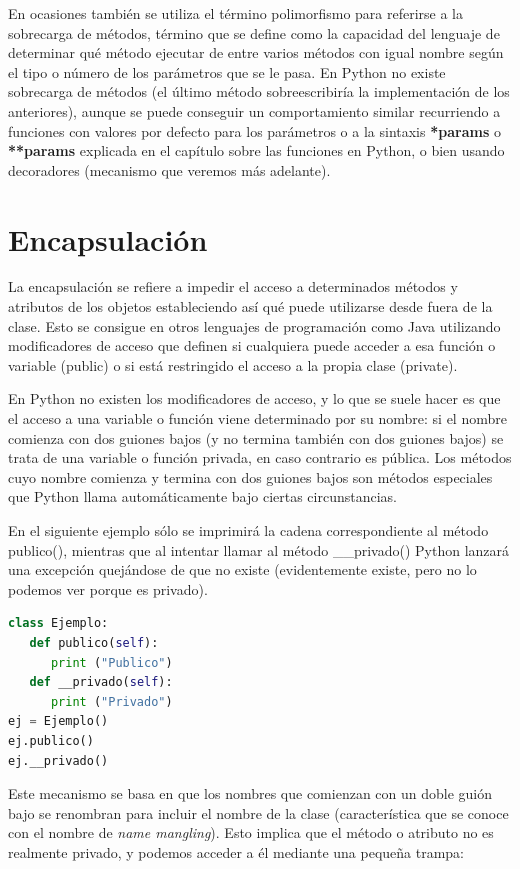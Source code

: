 \documentclass[12pt, twoside]{report}
\begin{document}
En ocasiones también se utiliza el término polimorfismo para referirse a la sobrecarga de métodos, término que se define como la capacidad del lenguaje de determinar qué método ejecutar de entre varios métodos con igual nombre según el tipo o número de los parámetros que se le pasa. En Python no existe sobrecarga de métodos (el último método sobreescribiría la implementación de los anteriores), aunque se puede conseguir un comportamiento similar recurriendo a funciones con valores por defecto para los parámetros o a la sintaxis \textbf{*params} o \textbf{**params} explicada en el capítulo sobre las funciones en Python, o bien usando decoradores (mecanismo que veremos más adelante).

\section{Encapsulación}

La encapsulación se refiere a impedir el acceso a determinados métodos y atributos de los objetos estableciendo así qué puede utilizarse desde fuera de la clase.
Esto se consigue en otros lenguajes de programación como Java utilizando modificadores de acceso que definen si cualquiera puede acceder a esa función o variable (public) o si está restringido el acceso a la propia clase (private).

En Python no existen los modificadores de acceso, y lo que se suele hacer es que el acceso a una variable o función viene determinado por su nombre: si el nombre comienza con dos guiones bajos (y no termina también con dos guiones bajos) se trata de una variable o función privada, en caso contrario es pública. Los métodos cuyo nombre comienza y termina con dos guiones bajos son métodos especiales que Python llama automáticamente bajo ciertas circunstancias.

En el siguiente ejemplo sólo se imprimirá la cadena correspondiente al método publico(), mientras que al intentar llamar al método \_\_privado() Python lanzará una excepción quejándose de que no existe (evidentemente existe, pero no lo podemos ver porque es privado).


\begin{lstlisting}[language=Python]
class Ejemplo:
   def publico(self):
      print ("Publico")
   def __privado(self):
      print ("Privado")
ej = Ejemplo()
ej.publico()
ej.__privado()
\end{lstlisting}

Este mecanismo se basa en que los nombres que comienzan con un doble guión bajo se renombran para incluir el nombre de la clase (característica que se conoce con el nombre de \textit{name mangling}). Esto implica que el método o atributo no es realmente privado, y podemos acceder a él mediante una pequeña trampa:
\end{document}
